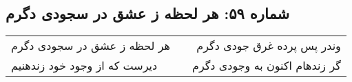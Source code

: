 \begin{center}
\section*{شماره ۵۹: هر لحظه ز عشق در سجودی دگرم}
\label{sec:059}
\begin{longtable}{l p{0.5cm} r}
هر لحظه ز عشق در سجودی دگرم
&&
وندر پس پرده غرق جودی دگرم
\\
دیرست که از وجود خود زندهنیم
&&
گر زندهام اکنون به وجودی دگرم
\\
\end{longtable}
\end{center}
